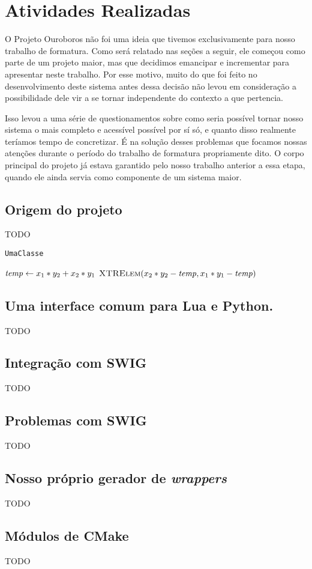 \def\classname#1{\texttt{#1}}

\chapter{Atividades Realizadas}
\label{sec:atividades}

O Projeto Ouroboros não foi uma ideia que tivemos exclusivamente para nosso
trabalho de formatura. Como será relatado nas seções a seguir, ele começou como
parte de um projeto maior, mas que decidimos emancipar e incrementar para
apresentar neste trabalho. Por esse motivo, muito do que foi feito no
desenvolvimento deste sistema antes dessa decisão não levou em consideração a
possibilidade dele vir a se tornar independente do contexto a que pertencia.

Isso levou a uma série de questionamentos sobre como seria possível tornar nosso
sistema o mais completo e acessível possível por sí só, e quanto disso realmente
teríamos tempo de concretizar. É na solução desses problemas que focamos nossas
atenções durante o período do trabalho de formatura propriamente dito. O corpo
principal do projeto já estava garantido pelo nosso trabalho anterior a essa
etapa, quando ele ainda servia como componente de um sistema maior.

\section{Origem do projeto}
\label{sec:atividades:origem}

TODO

\classname{UmaClasse} 

\begin{codebox}
    \zi $\id{temp} \gets x_1 * y_2 + x_2 * y_1$
    \zi \Return $\proc{XTRElem}(x_2 * y_2 - \id{temp}, x_1 * y_1 -
    \id{temp})$
\end{codebox}

\section{Uma interface comum para Lua e Python.}
\label{sec:atividades:opa}

TODO

\section{Integração com SWIG}

TODO

\section{Problemas com SWIG}

TODO

\section{Nosso próprio gerador de \emph{wrappers}}

TODO

\section{Módulos de CMake}

TODO
